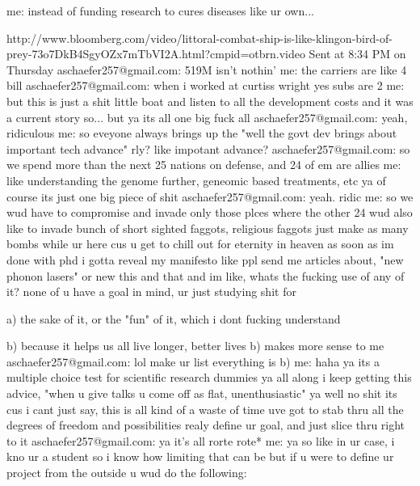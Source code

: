 me:  instead of funding research to cures diseases like ur own...

http://www.bloomberg.com/video/littoral-combat-ship-is-like-klingon-bird-of-prey-73o7DkB4SgyOZx7mTbVI2A.html?cmpid=otbrn.video
 Sent at 8:34 PM on Thursday
 aschaefer257@gmail.com:  519M isn't nothin'
 me:  the carriers are like 4 bill
 aschaefer257@gmail.com:  when i worked at curtiss wright
yes
subs are 2
 me:  but this is just a shit little boat
and listen to all the development costs
and it was a current story so...
but ya its all one big fuck all
 aschaefer257@gmail.com:  yeah, ridiculous
 me:  so eveyone always brings up the "well the govt dev brings about important tech advance"
rly?
like impotant advance?
 aschaefer257@gmail.com:  so we spend more than the next 25 nations on defense, and 24 of em are allies
 me:  like understanding the genome further, geneomic based treatments, etc
ya
of course its just one big piece of shit
 aschaefer257@gmail.com:  yeah.
ridic
 me:  so we wud have to compromise and invade only those plces where the other 24 wud also like to invade
bunch of short sighted faggots, religious faggots
just make as many bombs while ur here cus u get to chill out for eternity in heaven
as soon as im done with phd i gotta reveal my manifesto
like ppl send me articles about, "new phonon lasers"
or new this and that
and im like, whats the fucking use of any of it?
none of u have a goal in mind, ur just studying shit for

a) the sake of it, or the "fun" of it, which i dont fucking understand

b) because it helps us all live longer, better lives
b) makes more sense to me
 aschaefer257@gmail.com:  lol
make ur list
everything is b)
 me:  haha
ya its a multiple choice test for scientific research dummies
ya all along i keep getting this advice, "when u give talks u come off as flat, unenthusiastic"
ya well no shit
its cus i cant just say, this is all kind of a waste of time
uve got to stab thru all the degrees of freedom and possibilities
realy define ur goal, and just slice thru right to it
 aschaefer257@gmail.com:  ya it's all rorte
rote*
 me:  ya so like in ur case, i kno ur a student so i know how limiting that can be
but if u were to define ur project from the outside
u wud do the following:


